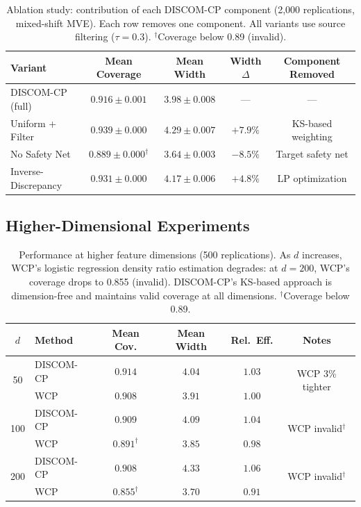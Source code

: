 \documentclass{article}
\newcommand{\DISCOM}{\textsc{DISCOM-CP}}
\begin{document}
\begin{table}[h]
\caption{Ablation study: contribution of each \DISCOM{} component (2,000 replications, mixed-shift MVE). Each row removes one component. All variants use source filtering ($\tau = 0.3$). $^\dagger$Coverage below 0.89 (invalid).}
\label{tab:ablation}
\centering
\small
\begin{tabular}{lcccc}
\toprule
\textbf{Variant} & \textbf{Mean Coverage} & \textbf{Mean Width} & \textbf{Width $\Delta$} & \textbf{Component Removed} \\
\midrule
DISCOM-CP (full) & $\mathbf{0.916 \pm 0.001}$ & $\mathbf{3.98 \pm 0.008}$ & --- & --- \\
Uniform + Filter & $0.939 \pm 0.000$ & $4.29 \pm 0.007$ & $+7.9\%$ & KS-based weighting \\
No Safety Net & $0.889 \pm 0.000^\dagger$ & $3.64 \pm 0.003$ & $-8.5\%$ & Target safety net \\
Inverse-Discrepancy & $0.931 \pm 0.000$ & $4.17 \pm 0.006$ & $+4.8\%$ & LP optimization \\
\bottomrule
\end{tabular}
\end{table}

\subsection*{Higher-Dimensional Experiments}

\begin{table}[h]
\caption{Performance at higher feature dimensions (500 replications). As $d$ increases, WCP's logistic regression density ratio estimation degrades: at $d=200$, WCP's coverage drops to 0.855 (invalid). \DISCOM{}'s KS-based approach is dimension-free and maintains valid coverage at all dimensions. $^\dagger$Coverage below 0.89.}
\label{tab:high_dim}
\centering
\small
\begin{tabular}{clcccc}
\toprule
$d$ & \textbf{Method} & \textbf{Mean Cov.} & \textbf{Mean Width} & \textbf{Rel.\ Eff.} & \textbf{Notes} \\
\midrule
\multirow{2}{*}{50} & \DISCOM{} & $0.914$ & $4.04$ & $1.03$ & \multirow{2}{*}{WCP 3\% tighter} \\
& WCP & $0.908$ & $3.91$ & $1.00$ & \\
\midrule
\multirow{2}{*}{100} & \DISCOM{} & $\mathbf{0.909}$ & $4.09$ & $1.04$ & \multirow{2}{*}{WCP invalid$^\dagger$} \\
& WCP & $0.891^\dagger$ & $3.85$ & $0.98$ & \\
\midrule
\multirow{2}{*}{200} & \DISCOM{} & $\mathbf{0.908}$ & $4.33$ & $1.06$ & \multirow{2}{*}{WCP invalid$^\dagger$} \\
& WCP & $0.855^\dagger$ & $3.70$ & $0.91$ & \\
\bottomrule
\end{tabular}
\end{table}
\end{document}
